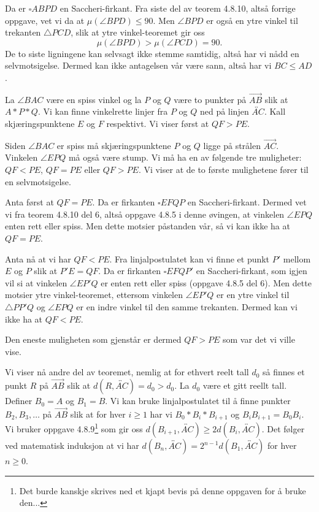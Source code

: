 \begin{oppgave}[4.8.8]
\begin{enumerate}
\begin{figure}
        \end{figure}

        Da er $\square ABPD$ en Saccheri-firkant. 
        Fra siste del av teorem 4.8.10, altså forrige oppgave, vet vi da at $\mu(\angle BPD)\leq 90$. 
        Men $\angle BPD$ er også en ytre vinkel til trekanten $\triangle PCD$, slik at ytre vinkel-teoremet gir oss
        $$\mu(\angle BPD)>\mu(\angle PCD) =90.$$
        De to siste ligningene kan selvsagt ikke stemme samtidig, altså har vi nådd en selvmotsigelse. 
        Dermed kan ikke antagelsen vår være sann, altså har vi $BC\leq AD$. 
    \end{enumerate}
\end{oppgave}

\begin{oppgave}[4.8.10]
    La $\angle BAC$ være en spiss vinkel og la $P$ og $Q$ være to punkter på $\overrightarrow{AB}$ slik at $A\ast P\ast Q$. 
    Vi kan finne vinkelrette linjer fra $P$ og $Q$ ned på linjen $\overleftrightarrow{AC}$. 
    Kall skjæringspunktene $E$ og $F$ respektivt. Vi viser først at $QF>PE$. 

    Siden $\angle BAC$ er spiss må skjæringspunktene $P$ og $Q$ ligge på strålen $\overrightarrow{AC}$. 
    Vinkelen $\angle EPQ$ må også være stump. 
    Vi må ha en av følgende tre muligheter: $QF<PE$, $QF=PE$ eller $QF>PE$.
    Vi viser at de to første mulighetene fører til en selvmotsigelse. 
    
    Anta først at $QF=PE$. 
    Da er firkanten $\square EFQP$ en Saccheri-firkant. 
    Dermed vet vi fra teorem 4.8.10 del 6, altså oppgave 4.8.5 i denne øvingen, at vinkelen $\angle EPQ$ enten rett eller spiss. 
    Men dette motsier påstanden vår, så vi kan ikke ha at $QF=PE$.

    Anta nå at vi har $QF<PE$. Fra linjalpostulatet kan vi finne et punkt $P'$ mellom $E$ og $P$ slik at $P'E=QF$.
    Da er firkanten $\square EFQP'$ en Saccheri-firkant, som igjen vil si at vinkelen $\angle EP'Q$ er enten rett eller spiss (oppgave 4.8.5 del 6). 
    Men dette motsier ytre vinkel-teoremet, ettersom vinkelen $\angle EP'Q$ er en ytre vinkel til $\triangle PP'Q$ og $\angle EPQ$ er en indre vinkel til den samme trekanten. 
    Dermed kan vi ikke ha at $QF<PE$. 

    Den eneste muligheten som gjenstår er dermed $QF>PE$ som var det vi ville vise. 

    Vi viser nå andre del av teoremet, nemlig at for ethvert reelt tall $d_0$ så finnes et punkt $R$ på $\overrightarrow{AB}$ slik at $d(R, \overleftrightarrow{AC})=d_0>d_0$. 
    La $d_0$ være et gitt reellt tall. 
    Definer $B_0=A$ og $B_1=B$. 
    Vi kan bruke linjalpostulatet til å finne punkter $B_2, B_3, \ldots$ på $\overrightarrow{AB}$ slik at for hver $i\geq 1$ har vi $B_0\ast B_i\ast B_{i+1}$ og $B_i B_{i+1}=B_0 B_i$. 
    Vi bruker oppgave 4.8.9\footnote{Det burde kanskje skrives ned et kjapt bevis på denne oppgaven for å bruke den...} som gir oss $d(B_{i+1}, \overleftrightarrow{AC})\geq 2 d(B_i, \overleftrightarrow{AC})$. 
    Det følger ved matematisk induksjon at vi har $d(B_n, \overleftrightarrow{AC})=2^{n-1}d(B_1, \overleftrightarrow{AC})$ for hver $n\geq 0$. 


\end{oppgave}
